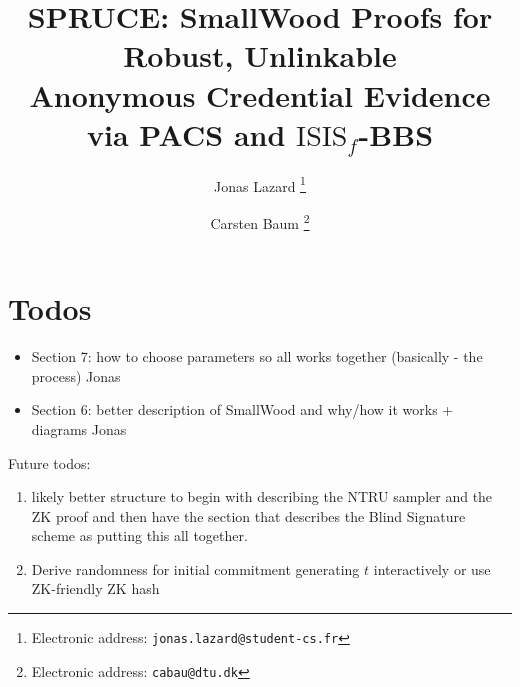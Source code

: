 \documentclass[11pt,a4paper]{article}
\title{SPRUCE: SmallWood Proofs for Robust, Unlinkable \\
 Anonymous Credential Evidence via PACS and $\mathrm{ISIS}_f$-BBS}
\author{Jonas Lazard%
  \thanks{Electronic address: \texttt{jonas.lazard@student-cs.fr}}}
\author{Carsten Baum%
  \thanks{Electronic address: \texttt{cabau@dtu.dk}}}
\affil{DTU Compute, Denmark}
\theoremstyle{definition}
\theoremstyle{plain}
\theoremstyle{remark}
\begin{document}
\maketitle


\section{Todos}
\begin{itemize}
    \item Section 7: how to choose parameters so all works together (basically - the process) {\color{blue} Jonas}
    \item Section 6: better description of SmallWood and why/how it works + diagrams {\color{blue} Jonas}
\end{itemize}

Future todos: 
\begin{enumerate}
    \item likely better structure to begin with describing the NTRU sampler and the ZK proof and then have the section that describes the Blind Signature scheme as putting this all together.
    \item Derive randomness for initial commitment generating $t$ interactively or use ZK-friendly ZK hash
\end{enumerate}




% 
% 


% 


















\nocite{cryptoeprint:2025/356,cryptoeprint:2025/1085,cryptoeprint:2023/1335,GPV08}


\end{document}
